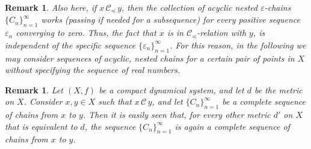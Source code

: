 \documentclass[10pt,a4paper]{article}
\theoremstyle{definition}
\theoremstyle{remark}
\theoremstyle{plain}
\newtheorem{rem}[defi]{Remark}
\begin{document}
\begin{rem}\label{canon_}
    Also here, if $x\,\mathcal{C}_\preceq\,y$, then the collection of acyclic nested $\varepsilon$-chains $\{C_n\}_{n=1}^\infty$ works (passing if needed for a subsequence) for every positive sequence $\varepsilon_n$ converging to zero. Thus, the fact that $x$ is in $\mathcal{C}_\preceq$-relation with $y$, is independent of the specific sequence $\{\varepsilon_n\}_{n=1}^\infty$. For this reason, in the following we may consider sequences of acyclic, nested chains for a certain pair of points in $X$ without specifying the sequence of real numbers.
\end{rem}



\begin{rem}\label{lem:chain-indipendence-metric}
 Let $(X,f)$ be a compact dynamical system, and let $d$ be the metric on $X$.
 Consider $x,y\in X$ such that $x\,\mathcal{C}\,y$, and let 
 $\{C_n\}_{n=1}^\infty$ be a complete sequence of chains from $x$ to $y$.
 Then it is easily seen that, for every other metric $d'$ on $X$ that is equivalent to $d$, 
 the sequence $\{C_n\}_{n=1}^\infty$ is again a complete sequence of chains 
 from $x$ to $y$.
\end{rem}




\end{document}
